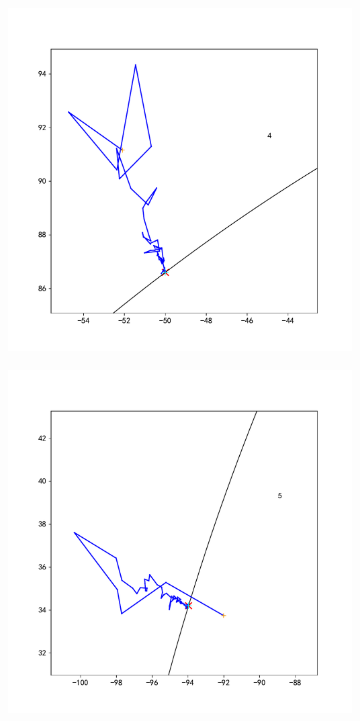 \documentclass[withoutpreface,bwprint]{cumcmthesis} %
\begin{document}
\begin{figure}[H]
\begin{subfigure}{0.32\linewidth}
    \end{subfigure}
    \begin{subfigure}{0.32\linewidth}
        \includegraphics[width=1.1\linewidth]{figures/c9_4.pdf}
    \end{subfigure}
    \begin{subfigure}{0.32\linewidth}
        \includegraphics[width=1.1\linewidth]{figures/c9_5.pdf}

\end{subfigure}
\end{figure}
\end{document}
